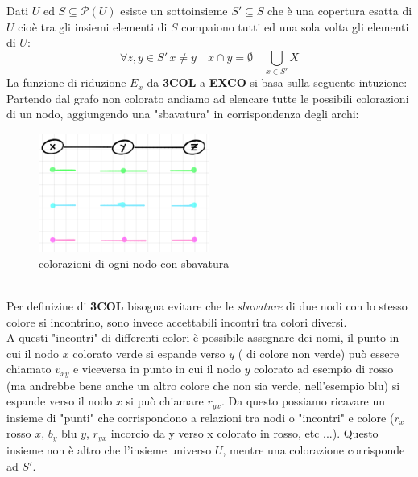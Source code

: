 \documentclass[a4paper]{article}
\begin{document}
Dati $U$ ed $S \subseteq \mathcal{P}(U)$ esiste un sottoinsieme $S' \subseteq S$ che è una copertura esatta di $U$ cioè tra gli insiemi elementi di $S$ compaiono tutti ed una sola volta gli elementi di $U$:
$$\forall z,y \in S'\, x \neq y \quad x \cap y = \emptyset \quad \bigcup_{x \in S'}X $$
La funzione di riduzione $E_x$ da \textbf{3COL} a \textbf{EXCO} si basa sulla seguente intuzione:\\
Partendo dal grafo non colorato andiamo ad elencare tutte le possibili colorazioni di un nodo, aggiungendo una "sbavatura" in corrispondenza degli archi:
\begin{figure}[!ht]
                \centering
                \includegraphics[width = 0.5\textwidth]{./img/E11_sbavatura.png}
                \caption{colorazioni di ogni nodo con sbavatura} \label{FIG:E11_sbavatura}
\end{figure}\\
Per definizine di \textbf{3COL} bisogna evitare che le \textit{sbavature} di due nodi con lo stesso colore si incontrino, sono invece accettabili incontri tra colori diversi.\\
A questi "incontri" di differenti colori è possibile assegnare dei nomi, il punto in cui il nodo $x$ colorato verde si espande verso $y$ ( di colore non verde) può essere chiamato $v_{xy}$ e viceversa in punto in cui il nodo $y$ colorato ad esempio di rosso (ma andrebbe bene anche un altro colore che non sia verde, nell'esempio blu) si espande verso il nodo $x$ si può chiamare $r_{yx}$.
Da questo possiamo ricavare un insieme di "punti" che corrispondono a relazioni tra nodi o "incontri" e colore ($r_x$ rosso $x$, $b_y$ blu $y$, $r_{yx}$ incorcio da y verso x colorato in rosso, etc ...).
Questo insieme non è altro che l'insieme universo $U$, mentre una colorazione corrisponde ad $S'$.
\end{document}
